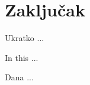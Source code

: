 \documentclass[a4paper,twoside,12pt]{memoir} %
\begin{document}
\section[Naslov poglavlja u sadržaju][Kratki naslov poglavlja]{Zaključak}






\pagestyle{empty} %


\begin{sazetak}
Ukratko ...
\end{sazetak}

\begin{summary}
In this ...
\end{summary}


\begin{cv}
Dana ...
\end{cv}
\end{document}
